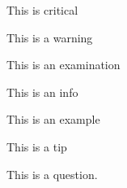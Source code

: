 \documentclass{liyua}
\begin{document}
\begin{critical}
	This is critical
\end{critical}
\begin{warning}
	This is a warning
\end{warning}
\begin{examination}
	This is an examination
\end{examination}
\begin{info}
	This is an info
\end{info}
\begin{example}
	This is an example
\end{example}
\begin{tip}
	This is a tip
\end{tip}
\begin{question}
	This is a question.
\end{question}
\end{document}
